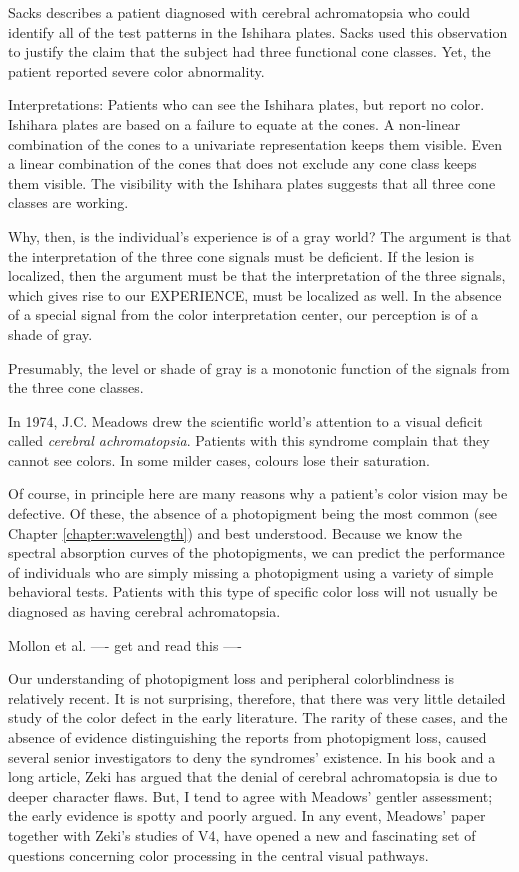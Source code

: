 Sacks describes a patient diagnosed with
cerebral achromatopsia who could identify all of the
test patterns in the Ishihara plates.
Sacks used this observation to justify the claim
that the subject had three functional cone classes.
Yet, the patient reported severe color abnormality.

Interpretations:
  Patients who can see the Ishihara plates, but report no color.
Ishihara plates are based on a failure to equate at the
cones.  A non-linear combination of the cones to a univariate
representation keeps them visible.
Even a linear combination of the cones that does not exclude
any cone class keeps them visible.
The visibility with the Ishihara plates suggests that all
three cone classes are working.

Why, then, is the individual's experience is of a gray world?
The argument is that the interpretation of the three cone signals
must be deficient.
If the lesion is localized, then the argument must be that
the interpretation of the three signals, which gives
rise to our EXPERIENCE, must be localized as well.
In the absence of a special signal from
the color interpretation center,
our perception is of a shade of gray.

Presumably, the level or shade of gray is a monotonic function
of the signals from the three cone classes.


\nocite{Meadows1974,Critchley1965}
In 1974, J.C. Meadows drew the scientific world's
attention to a visual deficit called
{\em cerebral achromatopsia}.
Patients with this syndrome
complain that they cannot see colors.
In some milder cases, colours lose their saturation.

Of course, in principle
here are many reasons why a patient's color
vision may be defective.
Of these, the absence
of a photopigment being the most common
(see Chapter \ref{chapter:wavelength}) and best understood.
Because we know the spectral absorption
curves of the photopigments,
we can predict the performance of
individuals who are simply missing a photopigment
using a variety of simple behavioral tests. 
Patients with this type of specific color loss will not usually
be diagnosed as having cerebral achromatopsia.

Mollon et al. ----  get and read this ----

Our understanding of photopigment loss and peripheral
colorblindness is relatively recent.
It is not surprising, therefore, that there was very
little detailed study of the color defect in the early
literature.
The rarity of these cases, and the absence of evidence
distinguishing the reports from photopigment loss,
caused several senior investigators to deny 
the syndromes' existence.
In his book and a long article,
Zeki has argued that the denial of cerebral achromatopsia
is due to deeper character flaws.
But, I tend to agree with Meadows' gentler assessment;
the early evidence is spotty and poorly argued.
In any event, Meadows' paper together with Zeki's studies of V4,
have opened a new and fascinating set of questions
concerning color processing in the central visual pathways.




